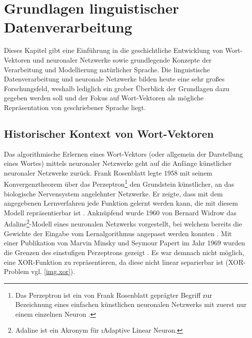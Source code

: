 \chapter{Grundlagen linguistischer Datenverarbeitung}\label{c.grundlagen}
Dieses Kapitel gibt eine Einführung in die geschichtliche Entwicklung von Wort-Vektoren und neuronaler Netzwerke sowie grundlegende Konzepte der Verarbeitung und Modellierung natürlicher Sprache. Die linguistische Datenverarbeitung und neuronale Netzwerke bilden heute eine sehr großes Forschungsfeld, weshalb lediglich ein grober Überblick der Grundlagen dazu gegeben werden soll und der Fokus auf Wort-Vektoren als mögliche Repräsentation von geschriebener Sprache liegt.

\section{Historischer Kontext von Wort-Vektoren}\label{s.historischerkontext}
Das algorithmische Erlernen eines Wort-Vektors (oder allgemein der Darstellung eines Wortes) mittels neuronaler Netzwerke geht auf die Anfänge künstlicher neuronaler Netzwerke zurück. Frank Rosenblatt legte 1958 mit seinem Konvergenztheorem über das Perzeptron\footnote{Das Perzeptron ist ein von Frank Rosenblatt geprägter Begriff zur Bezeichnung eines einfachen künstlichen neuronalen Netzwerks mit zuerst nur einem einzelnen Neuron \citep{Rosenblatt1958}.} den Grundstein künstlicher, an das biologische Nervensystem angelehnter Netzwerke. Er zeigte, dass mit dem angegebenen Lernverfahren jede Funktion gelernt werden kann, die mit diesem Modell repräsentierbar ist \citep{Rosenblatt1958}. Anknüpfend wurde 1960 von Bernard Widrow das Adaline\footnote{Adaline ist ein Akronym für \i{Adaptive Linear Neuron}.}-Modell eines neuronalen Netzwerks vorgestellt, bei welchem bereits die Gewichte der Eingabe vom Lernalgorithmus angepasst werden konnten \citep{Widrow1960}. Mit einer Publikation von Marvin Minsky und Seymour Papert im Jahr 1969 wurden die Grenzen des einstufigen Perzeptrons gezeigt \citep{Minsky1969}. Es war demnach nicht möglich, eine XOR-Funktion zu repräsentieren, da diese nicht linear separierbar ist (XOR-Problem vgl. \autoref{img.xor}).


